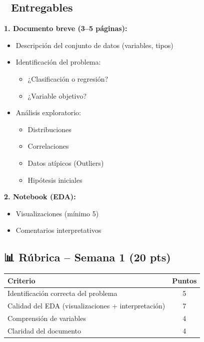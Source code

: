 \documentclass[11pt,a4paper]{article}
\begin{document}
\subsection*{📌 Entregables}

\textbf{1. Documento breve (3--5 páginas):}

\begin{itemize}[leftmargin=1.5cm]
\item Descripción del conjunto de datos (variables, tipos)
\item Identificación del problema:
\begin{itemize}[leftmargin=0.8cm]
\item ¿Clasificación o regresión?
\item ¿Variable objetivo?
\end{itemize}
\item Análisis exploratorio:
\begin{itemize}[leftmargin=0.8cm]
\item Distribuciones
\item Correlaciones
\item Datos atípicos (Outliers)
\item Hipótesis iniciales
\end{itemize}
\end{itemize}

\textbf{2. Notebook (EDA):}

\begin{itemize}[leftmargin=1.5cm]
\item Visualizaciones (mínimo 5)
\item Comentarios interpretativos
\end{itemize}

\subsection*{📊 Rúbrica -- Semana 1 (20 pts)}

\begin{table}[H]
\centering
\begin{tabular}{lc}
\toprule
\textbf{Criterio} & \textbf{Puntos} \\
\midrule
Identificación correcta del problema & 5 \\
Calidad del EDA (visualizaciones + interpretación) & 7 \\
Comprensión de variables & 4 \\
Claridad del documento & 4 \\
\bottomrule
\end{tabular}
\end{table}
\end{document}
